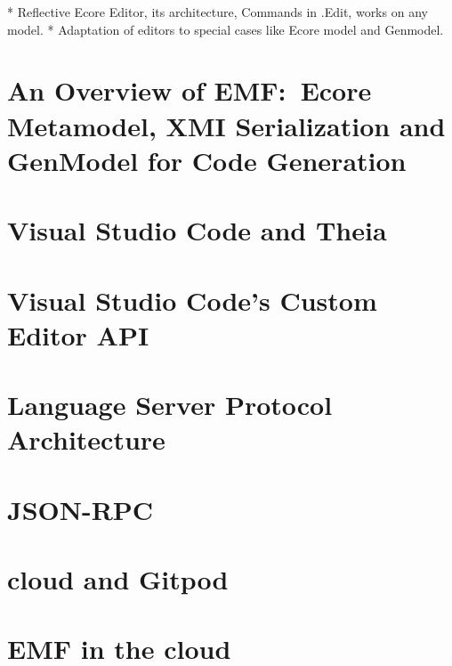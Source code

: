 * Reflective Ecore Editor, its architecture, Commands in .Edit, works on any model.
* Adaptation of editors to special cases like Ecore model and Genmodel.

\section{An Overview of EMF:\ Ecore Metamodel, XMI Serialization and GenModel for Code Generation}\label{sec:emf-metamodel}



\section{Visual Studio Code and Theia}




\section{Visual Studio Code's Custom Editor API}\label{sec:vscode-custom-editor}




\section{Language Server Protocol Architecture}\label{sec:lsp}




\section{JSON-RPC}\label{sec:json-rpc}




\section{\Gls{cloud} and \gls{Gitpod}}




\section{\acrlong{EMF} in the \Gls{cloud}}\label{sec:emf-in-cloud}

